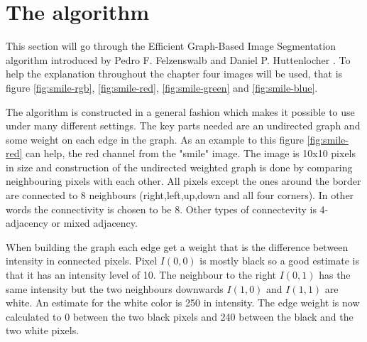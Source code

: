 \section{The algorithm}
This section will go through the Efficient Graph-Based Image Segmentation
algorithm introduced by Pedro F. Felzenswalb and Daniel P. Huttenlocher \cite{felzenszwalb2004}.
To help the explanation throughout the chapter four images will be used, that is figure \ref{fig:smile-rgb},
\ref{fig:smile-red}, \ref{fig:smile-green} and \ref{fig:smile-blue}.

The algorithm is constructed in a general fashion which makes it possible to use
under many different settings. The key parts needed are an undirected graph and
some weight on each edge in the graph. As an example to this figure \ref{fig:smile-red}
can help, the red channel from the "smile" image. The image is 10x10 pixels in
size and construction of the undirected weighted graph is done by comparing
neighbouring pixels with each other. All pixels except the ones around the border
are connected to 8 neighbours (right,left,up,down and all four corners).
In other words the connectivity is chosen to be 8. Other types of connectevity
is 4-adjacency or mixed adjacency.


When building the graph each edge get a weight that is the difference between
intensity in connected pixels. Pixel \(I(0,0)\) is mostly black so a good estimate
is that it has an intensity level of 10. The neighbour to the right \(I(0,1)\) has
the same intensity but the two neighbours downwards \(I(1,0)\) and \(I(1,1)\) are
white. An estimate for the white color is 250 in intensity. The edge weight is
now calculated to 0 between the two black pixels and 240 between the black and the
two white pixels.


